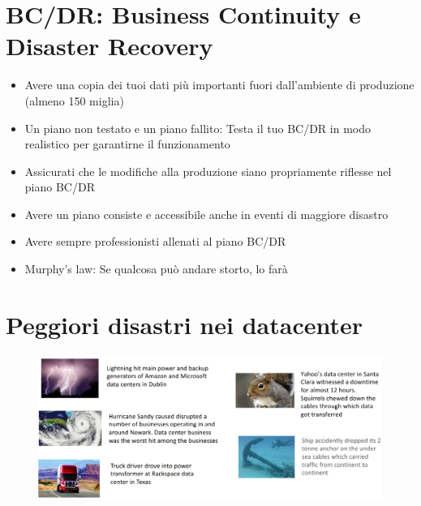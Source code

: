 \documentclass[a4paper, 12pt]{report}
\begin{document}
          \section{BC/DR: Business Continuity e Disaster Recovery}
          \begin{itemize}
            \item Avere una copia dei tuoi dati più importanti fuori dall'ambiente di produzione (almeno 150 miglia)
            \item Un piano non testato e un piano fallito: Testa il tuo BC/DR in modo realistico per garantirne il funzionamento
            \item Assicurati che le modifiche alla produzione siano propriamente riflesse nel piano BC/DR
            \item Avere un piano consiste e accessibile anche in eventi di maggiore disastro
            \item Avere sempre professionisti allenati al piano BC/DR 
            \item Murphy's law: Se qualcosa può andare storto, lo farà
          \end{itemize}
          \section{Peggiori disastri nei datacenter}
          \begin{figure}[h]
            \centering
            \includegraphics[scale=0.30]{Immagini/Disastri.png}
          \end{figure}
          \clearpage
\end{document}
